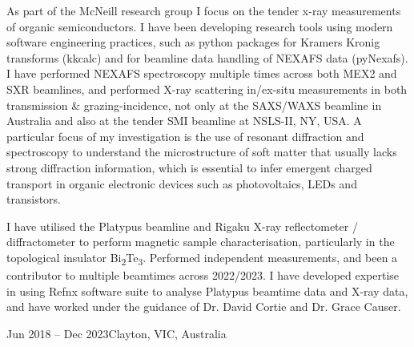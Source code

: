 \documentclass[10pt,a4paper,ragged2e,withhyper]{altacv}
\begin{document}
	
		{\textalignment
		As part of the McNeill research group I focus on the tender x-ray measurements of organic semiconductors. I have been developing research tools using modern software engineering practices, such as python packages for Kramers Kronig transforms (kkcalc) and for beamline data handling of NEXAFS data (pyNexafs). I have performed NEXAFS spectroscopy multiple times across both MEX2 and SXR beamlines, and performed X-ray scattering in/ex-situ measurements in both transmission \& grazing-incidence, not only at the SAXS/WAXS beamline in Australia and also at the tender SMI beamline at NSLS-II, NY, USA. A particular focus of my investigation is the use of resonant diffraction and spectroscopy to understand the microstructure of soft matter that usually lacks strong diffraction information, which is essential to infer emergent charged transport in organic electronic devices such as photovoltaics, LEDs and transistors.
		}
		
		\divider
	
		\newpage
		

		{\textalignment
		I have utilised the Platypus beamline and Rigaku X-ray reflectometer / diffractometer to perform magnetic sample characterisation, particularly in the topological insulator Bi\textsubscript{2}Te\textsubscript{3}. Performed independent measurements, and been a contributor to multiple beamtimes across 2022/2023. I have developed expertise in using Refnx software suite to analyse Platypus beamtime data and X-ray data, and have worked under the guidance of Dr. David Cortie and Dr. Grace Causer.
		}
		
		\divider


		{Jun 2018 -- Dec 2023}{Clayton, VIC, Australia}
\end{document}
